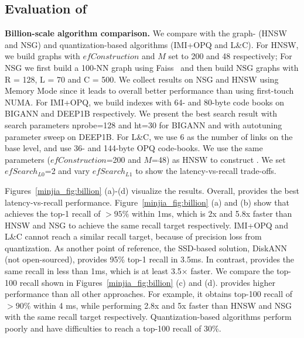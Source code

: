 \subsection{Evaluation of \name}
\label{minjia_subsec:eval-hmann}

\textbf{Billion-scale algorithm comparison.} We compare \algoname with the graph- (HNSW and NSG) and quantization-based algorithms (IMI+OPQ and L\&C).
For HNSW, we build graphs with $efConstruction$ and $M$ set to 200 and 48 respectively; For NSG we first build a 100-NN graph using Faiss~\cite{faiss} and then build NSG graphs with R = 128, L = 70 and C = 500. 
We collect results on NSG and HNSW using Memory Mode since it leads to overall better performance than using first-touch NUMA.
For IMI+OPQ, we build indexes with 64- and 80-byte code books on BIGANN and DEEP1B respectively. We present the best search result with search parameters nprobe=128 and ht=30 for BIGANN and with autotuning parameter sweep on DEEP1B. For L\&C,  we use 6 as the number of links on the base level, and use 36- and 144-byte OPQ code-books. We use the same parameters ($efConstruction$=200 and $M$=48) as HNSW to construct \name. We set $efSearch_{L0}$=2 and vary $efSearch_{L1}$ to show the latency-vs-recall trade-offs.

Figures~\ref{minjia_fig:billion} (a)-(d) visualize the results. Overall, \algoname provides the best latency-vs-recall performance. Figure~\ref{minjia_fig:billion} (a) and (b) show that \algoname achieves the top-1 recall of $>95\%$ within 1ms, which is 2x and 5.8x faster than HNSW and NSG to achieve the same recall target respectively.  
IMI+OPQ and L\&C cannot reach a similar recall target, because of precision loss from quantization. As another point of reference, the SSD-based solution, DiskANN~\cite{diskann} (not open-sourced), provides 95\% top-1 recall in 3.5ms. In contrast, \name provides the same recall in less than 1ms, which is at least 3.5\(\times\) faster.
We compare the top-100 recall shown in Figures~\ref{minjia_fig:billion} (c) and (d). \algoname provides higher performance than all other approaches. For example, it obtains top-100 recall of $>90\%$ within 4 ms, while performing 2.8x and 5x faster than HNSW and NSG with the same recall target respectively. Quantization-based algorithms perform poorly and have difficulties to reach a top-100 recall of 30\%. 

